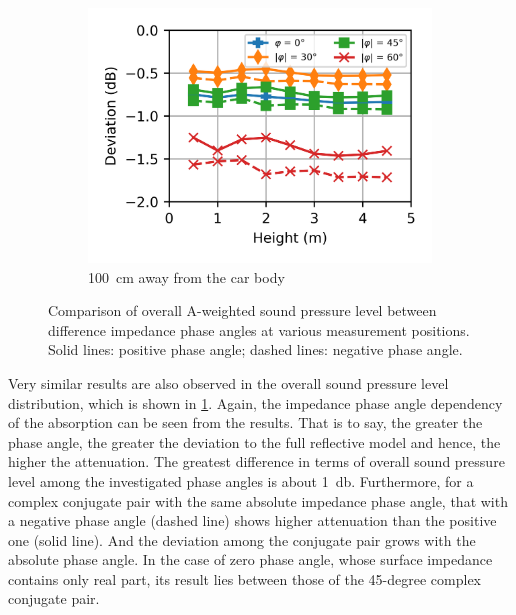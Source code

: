 \begin{figure}
\begin{subfigure}[b]{\textwidth}
		\includegraphics{fig/chap5/impedance/overall_SPL/deviation_pos_g.png}
		\caption{\SI{100}{\centi\meter} away from the car body}
	\end{subfigure}
	
	\caption{Comparison of overall A-weighted sound pressure level between difference impedance phase angles at various measurement positions. Solid lines: positive phase angle; dashed lines: negative phase angle.}
	\label{fig:overall_SPL_impedance}
\end{figure}

Very similar results are also observed in the overall sound pressure level distribution, which is shown in \cref{fig:overall_SPL_impedance}. Again, the impedance phase angle dependency of the absorption can be seen from the results. That is to say, the greater the phase angle, the greater the deviation to the full reflective model and hence, the higher the attenuation. The greatest difference in terms of overall sound pressure level among the investigated phase angles is about \SI{1}{\decibel}. Furthermore, for a complex conjugate pair with the same absolute impedance phase angle, that with a negative phase angle (dashed line) shows higher attenuation than the positive one (solid line). And the deviation among the conjugate pair grows with the absolute phase angle. In the case of zero phase angle, whose surface impedance contains only real part, its result lies between those of the 45-degree complex conjugate pair.

